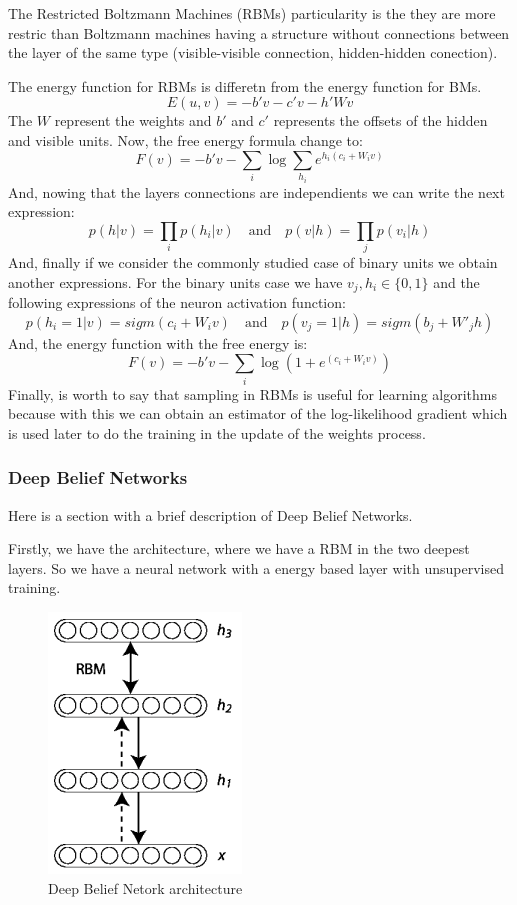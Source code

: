 \documentclass[12pt]{article}
\begin{document}
The Restricted Boltzmann Machines (RBMs) particularity is the they are more restric than Boltzmann machines having a structure without connections between the layer of the same type (visible-visible connection, hidden-hidden conection).

The energy function for RBMs is differetn from the energy function for BMs.
\begin{equation}
  E(u,v)= -b'v-c'v-h'Wv
\end{equation}
The $W$ represent the weights and $b'$ and $c'$ represents the offsets of the hidden and visible units. Now, the free energy formula change to:
\begin{equation}
  F(v)=-b'v - \displaystyle\sum_{i}\log\displaystyle\sum_{h_{i}}e^{h_{i}(c_{i}+W_{i}v)}
\end{equation}
And, nowing that the layers connections are independients we can write the next expression:
\begin{equation}
  p(h| v)=\prod_{i}p(h_{i}| v)\quad \textrm{and}\quad p(v| h)=\prod_{j}p(v_{i}|h)
\end{equation}
And, finally if we consider the commonly studied case of binary units we obtain another expressions. For the binary units case we have $v_{j},h_{i}\in\{0,1\}$ and the following expressions of the neuron activation function:
\begin{equation}
  p(h_{i}=1| v)= sigm(c_{i}+W_{i}v)\quad \textrm{and}\quad p(v_{j}=1| h)=sigm(b_{j}+W'_{j}h)
\end{equation}
And, the energy function with the free energy is:
\begin{equation}
  F(v)=-b'v - \displaystyle\sum_{i}\log(1+e^{(c_{i}+W_{i}v)})
\end{equation}
Finally, is worth to say that sampling in RBMs is useful for learning algorithms because with this we can obtain an estimator of the log-likelihood gradient which is used later to do the training in the update of the weights process.

\subsubsection{Deep Belief Networks}
Here is a section with a brief description of Deep Belief Networks.

Firstly, we have the architecture, where we have a RBM in the two deepest layers. So we have a neural network with a energy based layer with unsupervised training.
\begin{figure}[ht]
\centering
\includegraphics[width=.2\textwidth]{DBN.png}
\caption{Deep Belief Netork architecture}
\label{fig:figure3}
\end{figure}
\end{document}
